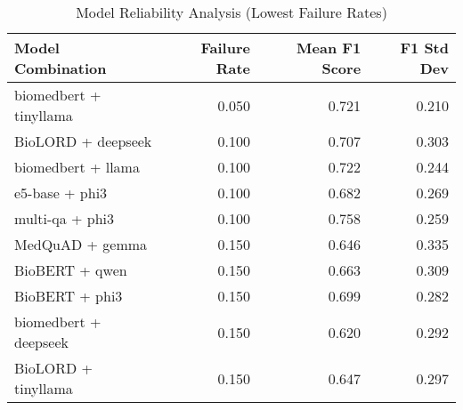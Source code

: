 \begin{table}
\caption{Model Reliability Analysis (Lowest Failure Rates)}
\label{tab:failure_analysis}
\begin{tabular}{lrrr}
\toprule
Model Combination & Failure Rate & Mean F1 Score & F1 Std Dev \\
\midrule
biomedbert + tinyllama & 0.050 & 0.721 & 0.210 \\
BioLORD + deepseek & 0.100 & 0.707 & 0.303 \\
biomedbert + llama & 0.100 & 0.722 & 0.244 \\
e5-base + phi3 & 0.100 & 0.682 & 0.269 \\
multi-qa + phi3 & 0.100 & 0.758 & 0.259 \\
MedQuAD + gemma & 0.150 & 0.646 & 0.335 \\
BioBERT + qwen & 0.150 & 0.663 & 0.309 \\
BioBERT + phi3 & 0.150 & 0.699 & 0.282 \\
biomedbert + deepseek & 0.150 & 0.620 & 0.292 \\
BioLORD + tinyllama & 0.150 & 0.647 & 0.297 \\
\bottomrule
\end{tabular}
\end{table}